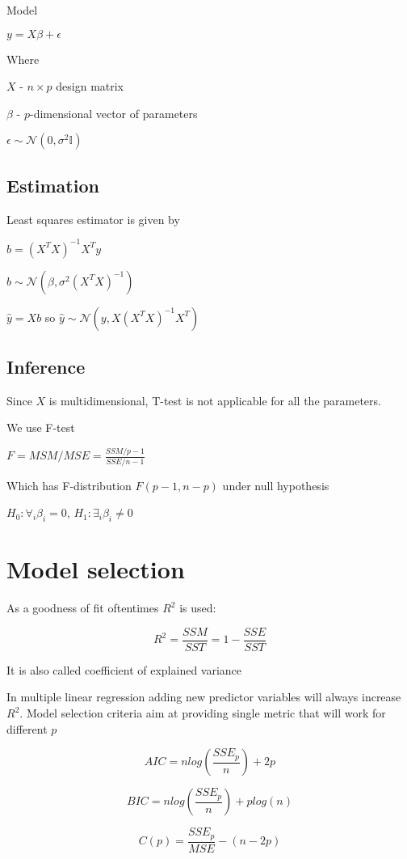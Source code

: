 \documentclass{article}
\begin{document}
Model
 
$y = X \beta + \epsilon$

Where

$X$ - $n \times p$ design matrix

$\beta$ - $p$-dimensional vector of parameters

$\epsilon \sim \mathcal{N}(0, \sigma^2 \mathbb{I})$

\subsection{Estimation}

Least squares estimator is given by

$b = (X^TX)^{-1}X^Ty$

$b \sim \mathcal{N}(\beta, \sigma^2 (X^T X)^{-1})$

$\hat{y} = Xb$ so $\hat{y} \sim \mathcal{N}(y, X(X^TX)^{-1}X^T)$ 

\subsection{Inference}

Since $X$ is multidimensional, T-test is not applicable for all the parameters.

We use F-test

$F = MSM/MSE = \frac{SSM/p-1}{SSE/n-1}$

Which has F-distribution $F(p-1, n-p)$ under null hypothesis

$H_0: \forall_i \beta_i = 0$, $H_1: \exists_i \beta_i \neq 0$

\section{Model selection}

As a goodness of fit oftentimes $R^2$ is used:

$$R^2 = \frac{SSM}{SST} = 1 - \frac{SSE}{SST}$$

It is also called coefficient of explained variance

In multiple linear regression adding new predictor variables will always increase $R^2$. Model selection criteria aim at providing single metric that will work for different $p$

$$AIC = n log(\frac{SSE_p}{n}) + 2p$$

$$BIC = n log(\frac{SSE_p}{n}) + p log(n)$$

$$C(p) = \frac{SSE_p}{MSE} - (n - 2p)$$
\end{document}

